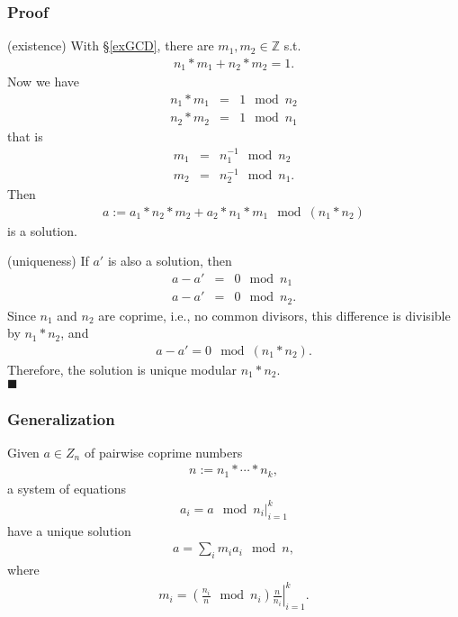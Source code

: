 \documentclass[11pt]{book}
\begin{document}
\subsubsection{Proof}
(existence) With \S\ref{exGCD}, there are $m_1,m_2 \in \mathbb{Z}$ s.t.
\begin{eqnarray}
n_1 * m_1 + n_2 * m_2 = 1.
\end{eqnarray}
Now we have
\begin{eqnarray}
n_1 * m_1 &=& 1 \mod n_2 \\
n_2 * m_2 &=& 1 \mod n_1
\end{eqnarray}
that is
\begin{eqnarray}
m_1 &=& n_1^{-1} \mod n_2 \\
m_2 &=& n_2^{-1} \mod n_1.
\end{eqnarray}
Then
\begin{eqnarray}
a := a_1 * n_2 * m_2 + a_2 * n_1 * m_1 \mod (n_1*n_2)
\end{eqnarray}
is a solution.

(uniqueness)
If $a'$ is also a solution, then
\begin{eqnarray}
a - a' &=& 0 \mod n_1 \\
a - a' &=& 0 \mod n_2.
\end{eqnarray}
Since $n_1$ and $n_2$ are coprime, i.e., no common divisors, this difference is divisible by $n_1*n_2$, and
\begin{eqnarray}
a - a' = 0 \mod (n_1 * n_2).
\end{eqnarray}
Therefore, the solution is unique modular $n_1*n_2$. \\
$\blacksquare$

\subsubsection{Generalization}
Given $a \in Z_n$ of pairwise coprime numbers
\begin{eqnarray}
n := n_1 * \cdots * n_k,
\end{eqnarray}
a system of equations
\begin{eqnarray}
\left. a_i = a \mod n_i \right|_{i=1}^k
\end{eqnarray}
have a unique solution
\begin{eqnarray}
a = \sum_i m_i a_i \mod n,
\end{eqnarray}
where
\begin{eqnarray}
\left. m_i = \left( \frac{n_i}{n} \mod n_i \right) \frac{n}{n_i} \right|_{i=1}^k.
\end{eqnarray}
\end{document}
